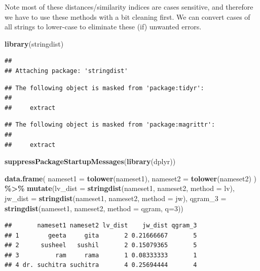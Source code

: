 \documentclass[
]{book}
\newenvironment{Shaded}{\begin{snugshade}}{\end{snugshade}}
\newcommand{\AttributeTok}[1]{\textcolor[rgb]{0.13,0.29,0.53}{#1}}
\newcommand{\DecValTok}[1]{\textcolor[rgb]{0.00,0.00,0.81}{#1}}
\newcommand{\FunctionTok}[1]{\textcolor[rgb]{0.13,0.29,0.53}{\textbf{#1}}}
\newcommand{\NormalTok}[1]{#1}
\newcommand{\SpecialCharTok}[1]{\textcolor[rgb]{0.81,0.36,0.00}{\textbf{#1}}}
\newcommand{\StringTok}[1]{\textcolor[rgb]{0.31,0.60,0.02}{#1}}
\begin{document}
Note most of these distances/similarity indices are cases sensitive, and therefore we have to use these methods with a bit cleaning first. We can convert cases of all strings to lower-case to eliminate these (if) unwanted errors.

\begin{Shaded}
\begin{Highlighting}[]
\FunctionTok{library}\NormalTok{(stringdist)}
\end{Highlighting}
\end{Shaded}

\begin{verbatim}
## 
## Attaching package: 'stringdist'
\end{verbatim}

\begin{verbatim}
## The following object is masked from 'package:tidyr':
## 
##     extract
\end{verbatim}

\begin{verbatim}
## The following object is masked from 'package:magrittr':
## 
##     extract
\end{verbatim}

\begin{Shaded}
\begin{Highlighting}[]
\FunctionTok{suppressPackageStartupMessages}\NormalTok{(}\FunctionTok{library}\NormalTok{(dplyr))}

\FunctionTok{data.frame}\NormalTok{(}
  \AttributeTok{nameset1 =} \FunctionTok{tolower}\NormalTok{(nameset1),}
  \AttributeTok{nameset2 =} \FunctionTok{tolower}\NormalTok{(nameset2)}
\NormalTok{) }\SpecialCharTok{\%\textgreater{}\%} 
  \FunctionTok{mutate}\NormalTok{(}\AttributeTok{lv\_dist =} \FunctionTok{stringdist}\NormalTok{(nameset1, nameset2, }\AttributeTok{method =} \StringTok{\textquotesingle{}lv\textquotesingle{}}\NormalTok{),}
         \AttributeTok{jw\_dist =} \FunctionTok{stringdist}\NormalTok{(nameset1, nameset2, }\AttributeTok{method =} \StringTok{\textquotesingle{}jw\textquotesingle{}}\NormalTok{),}
         \AttributeTok{qgram\_3 =} \FunctionTok{stringdist}\NormalTok{(nameset1, nameset2, }\AttributeTok{method =} \StringTok{\textquotesingle{}qgram\textquotesingle{}}\NormalTok{, }\AttributeTok{q=}\DecValTok{3}\NormalTok{))}
\end{Highlighting}
\end{Shaded}

\begin{verbatim}
##       nameset1 nameset2 lv_dist    jw_dist qgram_3
## 1        geeta     gita       2 0.21666667       5
## 2      susheel   sushil       2 0.15079365       5
## 3          ram     rama       1 0.08333333       1
## 4 dr. suchitra suchitra       4 0.25694444       4
\end{verbatim}
\end{document}
